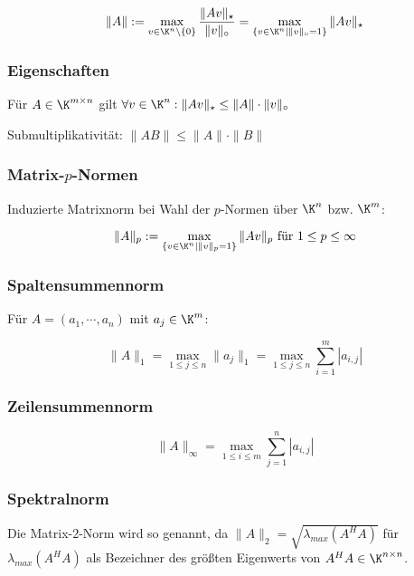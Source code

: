 \vspace*{-4mm}
$$\|A\| := \max_{v \in \K^n \setminus \{0\}} \frac{\|Av\|_\star}{\|v\|_\circ} = \max_{\{v \in \K^n | \|v\|_\circ = 1 \}} \|Av\|_\star$$

\subsubsection*{Eigenschaften}

Für $A \in \K^{m \times n}$ gilt $\forall v \in \K^n : \|Av\|_\star \leq \|A\| \cdot \|v\|_\circ$

Submultiplikativität: $\|AB\| \leq \|A\| \cdot \|B\|$

\subsubsection*{Matrix-$p$-Normen}

Induzierte Matrixnorm bei Wahl der $p$-Normen über $\K^n$ bzw. $\K^m$:

\vspace*{-4mm}
$$\|A\|_p := \max_{\{v \in \K^n | \|v\|_p = 1 \}} \|Av\|_p \text{ für } 1 \leq p \leq \infty$$

\subsubsection*{Spaltensummennorm}

Für $A = (a_1, \cdots, a_n)$ mit $a_j \in \K^m$:

\vspace*{-4mm}
$$\|A\|_1 = \max_{1 \leq j \leq n} \|a_j\|_1 = \max_{1 \leq j \leq n} \sum_{i=1}^m |a_{i,j}|$$

\subsubsection*{Zeilensummennorm}

\vspace*{-4mm}
$$\|A\|_\infty = \max_{1 \leq i \leq m} \sum_{j=1}^n |a_{i,j}|$$

\subsubsection*{Spektralnorm}

Die Matrix-$2$-Norm wird so genannt, da $\|A\|_2 = \sqrt{\lambda_{max}(A^H A)}$ für $\lambda_{max}(A^H A)$ als Bezeichner des größten Eigenwerts von $A^H A \in \K^{n \times n}$.

